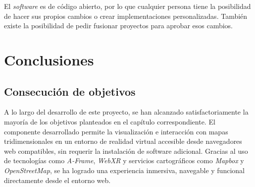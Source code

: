 \documentclass[a4paper, 12pt]{book}
\begin{document}
El \textit{software} es de código abierto, por lo que cualquier persona tiene la posibilidad de hacer sus propios cambios o crear implementaciones personalizadas. También existe la posibilidad de pedir fusionar proyectos para aprobar esos cambios.


\cleardoublepage
\chapter{Conclusiones}
\label{chap:conclusiones}


\section{Consecución de objetivos}
\label{sec:consecucion-objetivos}





A lo largo del desarrollo de este proyecto, se han alcanzado satisfactoriamente la mayoría de los objetivos planteados en el capítulo correspondiente. El componente desarrollado permite la visualización e interacción con mapas tridimensionales en un entorno de realidad virtual accesible desde navegadores web compatibles, sin requerir la instalación de software adicional. Gracias al uso de tecnologías como \textit{A-Frame}, \textit{WebXR} y servicios cartográficos como \textit{Mapbox} y \textit{OpenStreetMap}, se ha logrado una experiencia inmersiva, navegable y funcional directamente desde el entorno web.
\end{document}
